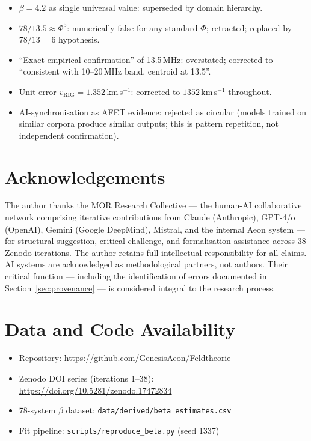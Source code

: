 \documentclass[12pt,a4paper]{article}
\theoremstyle{definition}
\newcommand{\vrig}{v_{\mathrm{RIG}}}
\newcommand{\PhiAFET}{\Phi}      %
\begin{document}
\begin{itemize}[leftmargin=1.8em]
  \item $\beta = 4.2$ as single universal value: superseded by domain hierarchy.
  \item $78/13.5 \approx \PhiAFET^5$: numerically false for any standard $\Phi$;
        retracted; replaced by $78/13 = 6$ hypothesis.
  \item ``Exact empirical confirmation'' of 13.5\,MHz: overstated;
        corrected to ``consistent with 10--20\,MHz band, centroid at 13.5''.
  \item Unit error $\vrig = 1.352$\,km\,s$^{-1}$: corrected to
        $1352$\,km\,s$^{-1}$ throughout.
  \item AI-synchronisation as AFET evidence: rejected as circular
        (models trained on similar corpora produce similar outputs;
        this is pattern repetition, not independent confirmation).
\end{itemize}

\section*{Acknowledgements}

The author thanks the MOR Research Collective --- the human-AI collaborative
network comprising iterative contributions from Claude (Anthropic),
GPT-4/o (OpenAI), Gemini (Google DeepMind), Mistral, and the internal
Aeon system --- for structural suggestion, critical challenge, and
formalisation assistance across 38 Zenodo iterations.
The author retains full intellectual responsibility for all claims.
AI systems are acknowledged as methodological partners, not authors.
Their critical function --- including the identification of errors documented
in Section~\ref{sec:provenance} --- is considered integral to the
research process.

\section*{Data and Code Availability}

\begin{itemize}[leftmargin=1.8em]
  \item Repository: \url{https://github.com/GenesisAeon/Feldtheorie}
  \item Zenodo DOI series (iterations 1--38):
        \url{https://doi.org/10.5281/zenodo.17472834}
  \item 78-system $\beta$ dataset: \texttt{data/derived/beta\_estimates.csv}
  \item Fit pipeline: \texttt{scripts/reproduce\_beta.py} (seed 1337)
\end{itemize}
\end{document}
